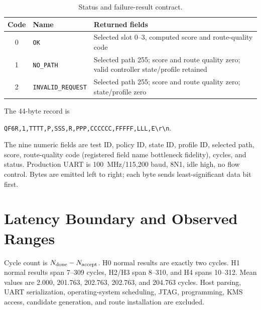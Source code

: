 \begin{table}[H]
\centering
\caption{Status and failure-result contract.}
\label{tab:appendix-status-contract}
\begin{tabularx}{\textwidth}{@{}c p{}X@{}}
\toprule
\textbf{Code} & \textbf{Name} & \textbf{Returned fields}\\
\midrule
0 & \texttt{OK} & Selected slot 0--3, computed score and route-quality code\\
1 & \texttt{NO\_PATH} & Selected path 255; score and route quality zero; valid
controller state/profile retained\\
2 & \texttt{INVALID\_REQUEST} & Selected path 255; score and route quality zero;
state/profile zero\\
\bottomrule
\end{tabularx}
\end{table}

The 44-byte record is
\begin{center}
\texttt{QF6R,1,TTTT,P,SSS,R,PPP,CCCCCC,FFFFF,LLL,E\textbackslash r\textbackslash n}.
\end{center}
The nine numeric fields are test ID, policy ID, state ID, profile ID, selected path,
score, route-quality code (registered field name bottleneck fidelity), cycles, and
status. Production UART is 100~MHz/115,200 baud, 8N1, idle high, no flow control.
Bytes are emitted left to right; each byte sends least-significant data bit first.

\section{Latency Boundary and Observed Ranges}

Cycle count is $N_{\rm done}-N_{\rm accept}$. H0 normal results are exactly two
cycles. H1 normal results span 7--309 cycles, H2/H3 span 8--310, and H4 spans
10--312. Mean values are 2.000, 201.763, 202.763, 202.763, and 204.763 cycles.
Host parsing, UART serialization, operating-system scheduling, JTAG, programming,
KMS access, candidate generation, and route installation are excluded.
